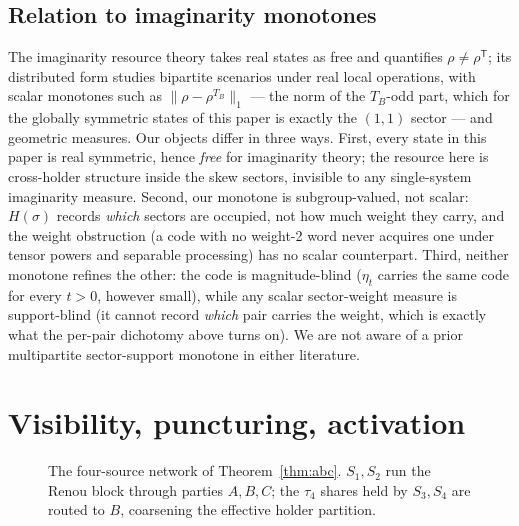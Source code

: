 \documentclass[11pt]{article}
\theoremstyle{plain}
\theoremstyle{definition}
\theoremstyle{remark}
\theoremstyle{plain}
\begin{document}
\subsection{Relation to imaginarity monotones}
\label{sec:imagcompare}

The imaginarity resource theory
\cite{hickeygour2018,wu2021prl,wu2021pra} takes real states as
free and quantifies $\rho\neq\rho^{\mathsf T}$; its distributed
form \cite{wu2024,kondra2023} studies bipartite scenarios under
real local operations, with scalar monotones such as
$\|\rho-\rho^{T_B}\|_1$ --- the norm of the $T_B$-odd part, which
for the globally symmetric states of this paper is exactly the
$(1,1)$ sector --- and geometric measures. Our objects differ in
three ways. First, every state in this paper is real symmetric,
hence \emph{free} for imaginarity theory; the resource here is
cross-holder structure inside the skew sectors, invisible to any
single-system imaginarity measure. Second, our monotone is
subgroup-valued, not scalar: $H(\sigma)$ records \emph{which}
sectors are occupied, not how much weight they carry, and the
weight obstruction (a code with no weight-2 word never acquires
one under tensor powers and separable processing) has no scalar
counterpart. Third, neither monotone refines the other: the code
is magnitude-blind ($\eta_t$ carries the same code for every
$t>0$, however small), while any scalar sector-weight measure is
support-blind (it cannot record \emph{which} pair carries the
weight, which is exactly what the per-pair dichotomy above turns
on). We are not aware of a prior multipartite sector-support
monotone in either literature.

\section{Visibility, puncturing, activation}
\label{sec:activation}

\begin{figure}[t]
\centering
{}
\caption{The four-source network of Theorem~\ref{thm:abc}.
$S_1,S_2$ run the Renou block through parties $A,B,C$; the
$\tau_4$ shares held by $S_3,S_4$ are routed to $B$, coarsening
the effective holder partition.}
\label{fig:network}
\end{figure}
\end{document}

